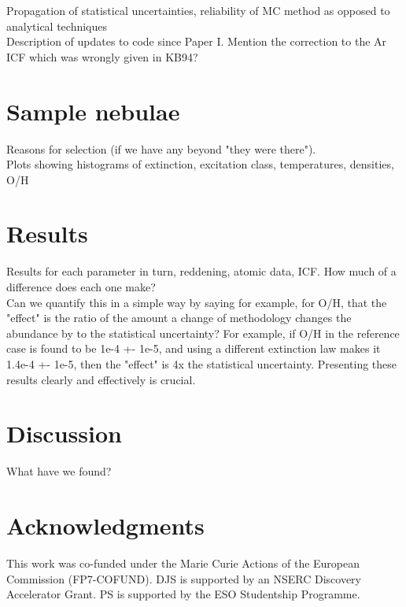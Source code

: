 \documentclass[useAMS,usenatbib]{../paper/mn2e}
\begin{document}
Propagation of statistical uncertainties, reliability of MC method as opposed to analytical techniques\\
Description of updates to code since Paper I.
Mention the correction to the Ar ICF which was wrongly given in KB94?

\section{Sample nebulae}

Reasons for selection (if we have any beyond "they were there").\\
Plots showing histograms of extinction, excitation class, temperatures, densities, O/H\\

\section{Results}

Results for each parameter in turn, reddening, atomic data, ICF.  How much of a difference does each one make?\\
Can we quantify this in a simple way by saying for example, for O/H, that the "effect" is the ratio of the amount a change of methodology changes the abundance by to the statistical uncertainty?  For example, if O/H in the reference case is found to be 1e-4 +- 1e-5, and using a different extinction law makes it 1.4e-4 +- 1e-5, then the "effect" is 4x the statistical uncertainty.
Presenting these results clearly and effectively is crucial.

\section{Discussion}

What have we found?

\section*{Acknowledgments}

This work was co-funded under the Marie Curie Actions of the European Commission (FP7-COFUND). DJS is supported by an NSERC Discovery Accelerator Grant.  PS is supported by the ESO Studentship Programme.




\label{lastpage}
\end{document}
